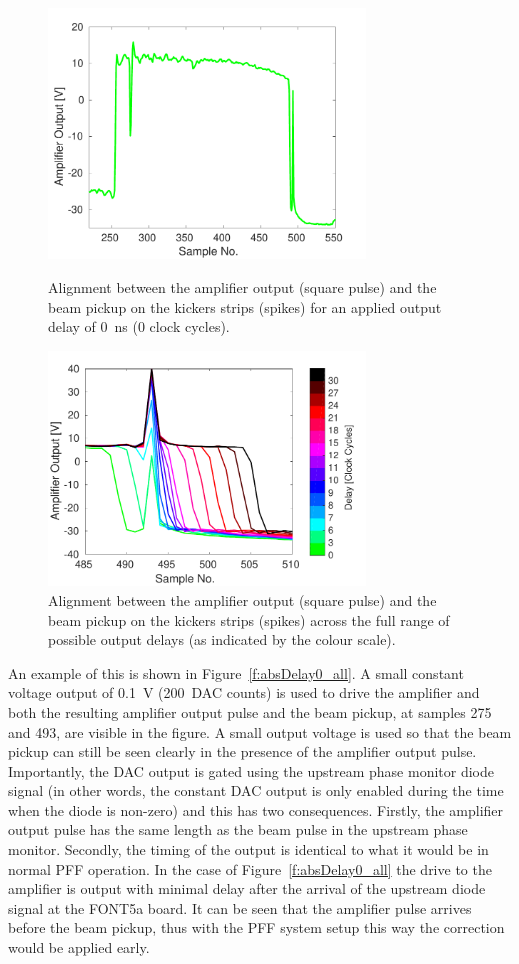 \begin{figure}
  \centering
  \includegraphics[width=0.75\textwidth]{Figures/commissioning/absDelay0_all}
  \caption{Alignment between the amplifier output (square pulse) and the beam pickup on the kickers strips (spikes) for an applied output delay of 0~ns (0 clock cycles).}
  \label{f:absDelay0_all}
  \includegraphics[width=0.75\textwidth]{Figures/commissioning/absDelayAll_endPulse}
  \caption{Alignment between the amplifier output (square pulse) and the beam pickup on the kickers strips (spikes) across the full range of possible output delays (as indicated by the colour scale).}
  \label{f:absDelayAll_endPulse}
\end{figure}

An example of this is shown in Figure~\ref{f:absDelay0_all}. A small constant voltage output of 0.1~V (200~DAC counts) is used to drive the amplifier and both the resulting amplifier output pulse and the beam pickup, at samples 275 and 493, are visible in the figure. A small output voltage is used so that the beam pickup can still be seen clearly in the presence of the amplifier output pulse. Importantly, the DAC output is gated using the upstream phase monitor diode signal (in other words, the constant DAC output is only enabled during the time when the diode is non-zero) and this has two consequences. Firstly, the amplifier output pulse has the same length as the beam pulse in the upstream phase monitor. Secondly, the timing of the output is identical to what it would be in normal PFF operation. In the case of Figure~\ref{f:absDelay0_all} the drive to the amplifier is output with minimal delay after the arrival of the upstream diode signal at the FONT5a board. It can be seen that the amplifier pulse arrives before the beam pickup, thus with the PFF system setup this way the correction would be applied early. 

